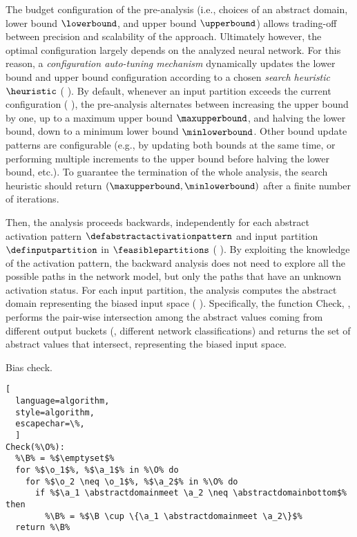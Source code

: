 {The budget configuration of the pre-analysis (i.e., choices of an abstract domain, lower bound $\lowerbound$, and upper bound $\upperbound$) allows trading-off between precision and scalability of the approach. Ultimately however, the optimal configuration largely depends on the analyzed neural network. For this reason, a \emph{configuration auto-tuning mechanism} dynamically updates the lower bound and upper bound configuration according to a chosen \emph{search heuristic} $\heuristic$ (\cf{} ). By default, whenever an input partition exceeds the current configuration (\cf{} ), the pre-analysis alternates between increasing the upper bound by one, up to a maximum upper bound $\maxupperbound$, and halving the lower bound, down to a minimum lower bound $\minlowerbound$. Other bound update patterns are configurable (e.g., by updating both bounds at the same time, or performing multiple increments to the upper bound before halving the lower bound, etc.). To guarantee the termination of the whole analysis, the search heuristic should return $(\maxupperbound, \minlowerbound)$ after a finite number of iterations.


Then, the analysis proceeds backwards, independently for each abstract activation pattern $\defabstractactivationpattern$ and input partition $\definputpartition$ in $\feasiblepartitions$ (\cf{} ).
By exploiting the knowledge of the activation pattern, the backward analysis does not need to explore all the possible paths in the network model, but only the paths that have an unknown activation status. For each input partition, the analysis computes the abstract domain representing the biased input space (\cf{} ). Specifically, the function \textup{Check}, \cf{} , performs the pair-wise intersection among the abstract values coming from different output buckets (\ie, different network classifications) and returns the set of abstract values that intersect, representing the biased input space.

\begin{marginalgorithm}
  \caption{Bias check.}
\begin{lstlisting}[
  language=algorithm,
  style=algorithm,
  escapechar=\%,
  ]
Check(%\O%):
  %\B% = %$\emptyset$%
  for %$\o_1$%, %$\a_1$% in %\O% do
    for %$\o_2 \neq \o_1$%, %$\a_2$% in %\O% do
      if %$\a_1 \abstractdomainmeet \a_2 \neq \abstractdomainbottom$% then
        %\B% = %$\B \cup \{\a_1 \abstractdomainmeet \a_2\}$%
  return %\B%
\end{lstlisting}
\end{marginalgorithm}

}
